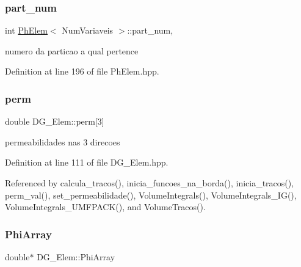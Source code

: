 \subsubsection{\texorpdfstring{part\+\_\+num}{part\_num}}
{\footnotesize\ttfamily int \hyperlink{classPhElem}{Ph\+Elem}$<$ Num\+Variaveis $>$\+::part\+\_\+num\hspace{0.3cm}{\ttfamily [protected]}, {\ttfamily [inherited]}}



numero da particao a qual pertence 



Definition at line 196 of file Ph\+Elem.\+hpp.

\mbox{\label{classDG__Elem_a4b1a31424c3c115bc5bb964c3b72be66}} 
\subsubsection{\texorpdfstring{perm}{perm}}
{\footnotesize\ttfamily double D\+G\+\_\+\+Elem\+::perm\mbox{[}3\mbox{]}\hspace{0.3cm}{\ttfamily [private]}}



permeabilidades nas 3 direcoes 



Definition at line 111 of file D\+G\+\_\+\+Elem.\+hpp.



Referenced by calcula\+\_\+tracos(), inicia\+\_\+funcoes\+\_\+na\+\_\+borda(), inicia\+\_\+tracos(), perm\+\_\+val(), set\+\_\+permeabilidade(), Volume\+Integrals(), Volume\+Integrals\+\_\+\+I\+G(), Volume\+Integrals\+\_\+\+U\+M\+F\+P\+A\+C\+K(), and Volume\+Tracos().

\mbox{\label{classDG__Elem_a79caff690ab51cd79dabbb5fd110d111}} 
\subsubsection{\texorpdfstring{Phi\+Array}{PhiArray}}
{\footnotesize\ttfamily double$\ast$ D\+G\+\_\+\+Elem\+::\+Phi\+Array\hspace{0.3cm}{\ttfamily [private]}}



